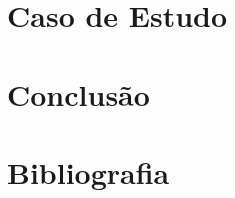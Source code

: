 \documentclass[10pt,a4paper]{article}
\begin{document}
\section{Caso de Estudo}

\section{Conclusão}

\newpage

\section{Bibliografia}


\printindex
\end{document}
